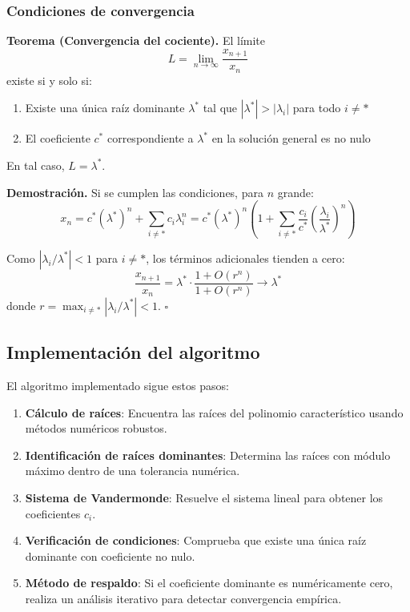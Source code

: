 \documentclass[12pt]{article}
\begin{document}
\subsubsection{Condiciones de convergencia}

\textbf{Teorema (Convergencia del cociente).} El límite
\[
L = \lim_{n \to \infty} \frac{x_{n+1}}{x_n}
\]
existe si y solo si:
\begin{enumerate}
    \item Existe una única raíz dominante $\lambda^*$ tal que $|\lambda^*| > |\lambda_i|$ para todo $i \neq *$
    \item El coeficiente $c^*$ correspondiente a $\lambda^*$ en la solución general es no nulo
\end{enumerate}

En tal caso, $L = \lambda^*$.

\textbf{Demostración.} Si se cumplen las condiciones, para $n$ grande:
\[
x_n = c^* (\lambda^*)^n + \sum_{i \neq *} c_i \lambda_i^n = c^* (\lambda^*)^n \left(1 + \sum_{i \neq *} \frac{c_i}{c^*} \left(\frac{\lambda_i}{\lambda^*}\right)^n\right)
\]

Como $|\lambda_i/\lambda^*| < 1$ para $i \neq *$, los términos adicionales tienden a cero:
\[
\frac{x_{n+1}}{x_n} = \lambda^* \cdot \frac{1 + O(r^n)}{1 + O(r^n)} \to \lambda^*
\]
donde $r = \max_{i \neq *} |\lambda_i/\lambda^*| < 1$. $\square$

\subsection{Implementación del algoritmo}

El algoritmo implementado sigue estos pasos:

\begin{enumerate}
    \item \textbf{Cálculo de raíces}: Encuentra las raíces del polinomio característico usando métodos numéricos robustos.
    
    \item \textbf{Identificación de raíces dominantes}: Determina las raíces con módulo máximo dentro de una tolerancia numérica.
    
    \item \textbf{Sistema de Vandermonde}: Resuelve el sistema lineal para obtener los coeficientes $c_i$.
    
    \item \textbf{Verificación de condiciones}: Comprueba que existe una única raíz dominante con coeficiente no nulo.
    
    \item \textbf{Método de respaldo}: Si el coeficiente dominante es numéricamente cero, realiza un análisis iterativo para detectar convergencia empírica.
\end{enumerate}
\end{document}
